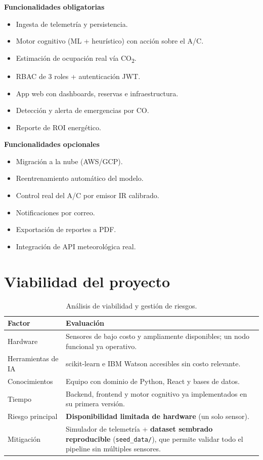 \documentclass[11pt,a4paper]{article}
\begin{document}
\begin{minipage}[t]{0.5\linewidth}
\textbf{Funcionalidades obligatorias}
\begin{itemize}
\item Ingesta de telemetría y persistencia.
\item Motor cognitivo (ML + heurístico) con acción sobre el A/C.
\item Estimación de ocupación real vía CO\textsubscript{2}.
\item RBAC de 3 roles + autenticación JWT.
\item App web con dashboards, reservas e infraestructura.
\item Detección y alerta de emergencias por CO.
\item Reporte de ROI energético.
\end{itemize}
\end{minipage}\hfill
\begin{minipage}[t]{0.46\linewidth}
\textbf{Funcionalidades opcionales}
\begin{itemize}
\item Migración a la nube (AWS/GCP).
\item Reentrenamiento automático del modelo.
\item Control real del A/C por emisor IR calibrado.
\item Notificaciones por correo.
\item Exportación de reportes a PDF.
\item Integración de API meteorológica real.
\end{itemize}
\end{minipage}

\section{Viabilidad del proyecto}\label{sec:viab}

\begin{table}[H]\centering\small
\begin{tabular}{@{}L{3.4cm}L{11.4cm}@{}}
\toprule
\textbf{Factor} & \textbf{Evaluación} \\
\midrule
Hardware & Sensores de bajo costo y ampliamente disponibles; un nodo funcional ya operativo. \\
Herramientas de IA & scikit-learn e IBM Watson accesibles sin costo relevante. \\
Conocimientos & Equipo con dominio de Python, React y bases de datos. \\
Tiempo & Backend, frontend y motor cognitivo ya implementados en su primera versión. \\
Riesgo principal & \textbf{Disponibilidad limitada de hardware} (un solo sensor). \\
Mitigación & Simulador de telemetría + \textbf{dataset sembrado reproducible} (\texttt{seed\_data/}), que permite validar todo el pipeline sin múltiples sensores. \\
\bottomrule
\end{tabular}
\caption{Análisis de viabilidad y gestión de riesgos.}
\end{table}
\end{document}
